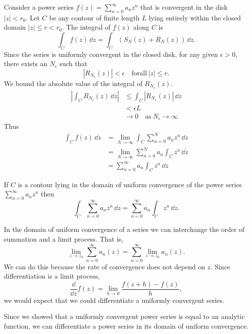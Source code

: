 Consider a power series $f(z) = \sum_{n = 0}^\infty a_n z^n$ that is convergent in the 
disk $|z| < r_0$.  Let $C$ be any contour of finite length $L$
lying entirely within the closed domain $|z| \leq r < r_0$.  
The integral of $f(z)$ along $C$ is
\[
\int_C f(z)\,\dd z = \int_C (S_N(z) + R_N(z))\,\dd z.
\]
Since the series is uniformly convergent in the closed disk, 
for any given $\epsilon > 0$, there exists an $N_\epsilon$ such that
\[ 
|R_{N_\epsilon}(z)| < \epsilon \quad \mathrm{for all}\ |z| \leq r.
\]
We bound the absolute value of the integral of $R_{N_\epsilon}(z)$.
\begin{align*}
  \left| \int_C R_{N_\epsilon}(z)\,\dd z \right|
  &\leq \int_C |R_{N_\epsilon}(z)|\,\dd z 
  \\
  &< \epsilon L 
  \\
  &\to 0 \quad \mathrm{as}\ N_\epsilon \to \infty
\end{align*}
Thus
\begin{align*}
  \int_C f(z)\,\dd z
  &= \lim_{N \to \infty} \int_C \sum_{n=0}^N a_n z^n\,\dd z 
  \\
  &= \lim_{N \to \infty} \sum_{n=0}^N a_n \int_C z^n\,\dd z 
  \\
  &= \sum_{n = 0}^\infty a_n \int_C z^n\,\dd z
\end{align*}












\begin{Result}
  If $C$ is a contour lying in the domain of uniform convergence of the
  power series $\sum_{n = 0}^\infty a_n z^n$ then
  \[ 
  \int_C \sum_{n = 0}^\infty a_n z^n \,\dd z = \sum_{n = 0}^\infty a_n \int_C z^n\,\dd z.
  \]
\end{Result}




In the domain of uniform convergence of a series we can interchange the
order of summation and a limit process.  That is,
\[ 
\lim_{z \to z_0} \sum_{n = 0}^\infty a_n(z) = \sum_{n = 0}^\infty \lim_{z \to z_0} a_n(z).
\]
We can do this because the rate of convergence does not depend on $z$.
Since differentiation is a limit process,
\[ 
\frac{\dd}{\dd z} f(z) = \lim_{h \to 0} \frac{f(z+h) - f(z)}{h},
\]
we would expect that we could differentiate a uniformly convergent series. 

Since we showed that a uniformly convergent power series is equal to an 
analytic function, we can differentiate a power series in its domain of 
uniform convergence.



